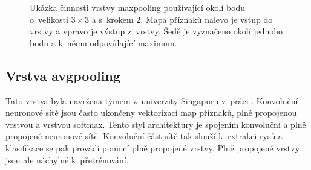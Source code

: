 \begin{figure}
\centering
{}
\caption{
Ukázka činnosti vrstvy maxpooling používající okolí bodu o~velikosti $3{\times}3$ a s~krokem 2.
Mapa příznaků nalevo je vstup do vrstvy a vpravo je výstup z~vrstvy.
Šedě je vyznačeno okolí jednoho bodu a k~němu odpovídající maximum.
}
\label{fig:maxpool}
\end{figure}

\subsection{Vrstva avgpooling}
\label{sub:avgpooling}

Tato vrstva byla navržena týmem z~univerzity Singapuru v~práci \cite{Lin2013}.
Konvoluční neuronové sítě jsou často ukončeny vektorizací map příznaků, plně propojenou vrstvou a vrstvou softmax.
Tento styl architektury je spojením konvoluční a plně propojené neuronové sítě.
Konvoluční část sítě tak slouží k~extrakci rysů a klasifikace se pak provádí pomocí plně propojené vrstvy.
Plně propojené vrstvy jsou ale náchylné k~přetrénování.


